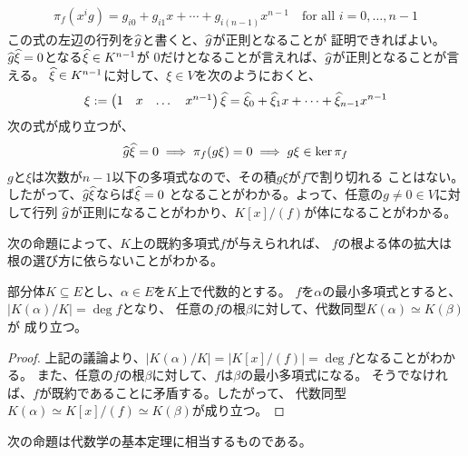 {\begin{equation*}
\begin{split}
		\pi_f(x^ig) = g_{i0} + g_{i1}x +\cdots+ g_{i(n-1)}x^{n-1}
		\quad\text{for all } i=0,\dots,n-1
	\end{split}\end{equation*}
	この式の左辺の行列を$\widehat{g}$と書くと、$\widehat{g}$が正則となることが
	証明できればよい。$\widehat{g}\widehat{\xi}=0$となる$\widehat{\xi}\in K^{n-1}$が
	$0$だけとなることが言えれば、$\widehat{g}$が正則となることが言える。
	$\widehat{\xi}\in K^{n-1}$に対して、$\xi\in V$を次のようにおくと、
	\begin{equation*}\begin{split}
		\xi := \begin{pmatrix}
			1 & x &\dots& x^{n-1}
		\end{pmatrix}\widehat{\xi} 
		= \widehat{\xi}_0 + \widehat{\xi}_1x +\cdots+ \widehat{\xi}_{n-1}x^{n-1}
	\end{split}\end{equation*}
	次の式が成り立つが、
	\begin{equation*}\begin{split}
		\widehat{g}\widehat{\xi} = 0 \implies \pi_f(g\xi) = 0
		\implies g\xi\in \ker\pi_f
	\end{split}\end{equation*}
	$g$と$\xi$は次数が$n-1$以下の多項式なので、その積$g\xi$が$f$で割り切れる
	ことはない。したがって、$\widehat{g}\widehat{\xi}$ならば$\widehat{\xi}=0$
	となることがわかる。よって、任意の$g\neq0\in V$に対して行列
	$\widehat{g}$が正則になることがわかり、$K[x]/(f)$が体になることがわかる。

	次の命題によって、$K$上の既約多項式$f$が与えられれば、
	$f$の根よる体の拡大は根の選び方に依らないことがわかる。

	\begin{proposition}[根の選び方]\label{prop:根の選び方} %
		部分体$K\subseteq E$とし、$\alpha\in E$を$K$上で代数的とする。
		$f$を$\alpha$の最小多項式とすると、$|K(\alpha)/K|=\deg f$となり、
		任意の$f$の根$\beta$に対して、代数同型$K(\alpha)\simeq K(\beta)$が
		成り立つ。
	\end{proposition} %
	\begin{proof} %
		上記の議論より、$|K(\alpha)/K|=|K[x]/(f)|=\deg f$となることがわかる。
		また、任意の$f$の根$\beta$に対して、$f$は$\beta$の最小多項式になる。
		そうでなければ、$f$が既約であることに矛盾する。したがって、
		代数同型$K(\alpha)\simeq K[x]/(f)\simeq K(\beta)$が成り立つ。
	\end{proof} %

	次の命題は代数学の基本定理に相当するものである。

}
